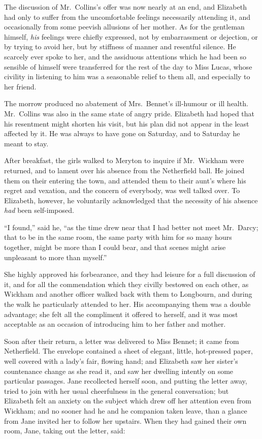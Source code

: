\documentclass[12pt,english,oneside]{book}
\begin{document}


The discussion of Mr.\ Collins's offer was now nearly at an end,
and Elizabeth had only to suffer from the uncomfortable feelings necessarily
attending it, and occasionally from some peevish allusions of her
mother. As for the gentleman himself, \textit{his} feelings were chiefly
expressed, not by embarrassment or dejection, or by trying to avoid
her, but by stiffness of manner and resentful silence. He scarcely
ever spoke to her, and the assiduous attentions which he had been
so sensible of himself were transferred for the rest of the day to
Miss Lucas, whose civility in listening to him was a seasonable relief
to them all, and especially to her friend.

The morrow produced no abatement of Mrs.\ Bennet's ill-humour or
ill health. Mr.\ Collins was also in the same state of angry pride.
Elizabeth had hoped that his resentment might shorten his visit, but
his plan did not appear in the least affected by it. He was always
to have gone on Saturday, and to Saturday he meant to stay.

After breakfast, the girls walked to Meryton to inquire if Mr.\ Wickham
were returned, and to lament over his absence from the Netherfield
ball. He joined them on their entering the town, and attended them
to their aunt's where his regret and vexation, and the concern of
everybody, was well talked over. To Elizabeth, however, he voluntarily
acknowledged that the necessity of his absence \textit{had} been self-imposed.

{}``I found,'' said he, {}``as the time drew near that I had better
not meet Mr.\ Darcy; that to be in the same room, the same party
with him for so many hours together, might be more than I could bear,
and that scenes might arise unpleasant to more than myself.''

She highly approved his forbearance, and they had leisure for a full
discussion of it, and for all the commendation which they civilly
bestowed on each other, as Wickham and another officer walked back
with them to Longbourn, and during the walk he particularly attended
to her. His accompanying them was a double advantage; she felt all
the compliment it offered to herself, and it was most acceptable as
an occasion of introducing him to her father and mother.

Soon after their return, a letter was delivered to Miss Bennet; it
came from Netherfield. The envelope contained a sheet of elegant,
little, hot-pressed paper, well covered with a lady's fair, flowing
hand; and Elizabeth saw her sister's countenance change as she read
it, and saw her dwelling intently on some particular passages. Jane
recollected herself soon, and putting the letter away, tried to join
with her usual cheerfulness in the general conversation; but Elizabeth
felt an anxiety on the subject which drew off her attention even from
Wickham; and no sooner had he and he companion taken leave, than a
glance from Jane invited her to follow her upstairs. When they had
gained their own room, Jane, taking out the letter, said:
\end{document}
